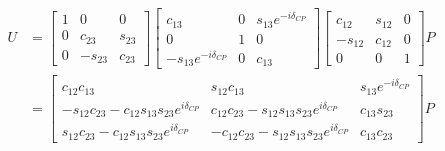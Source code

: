 \begin{equation}
    \begin{aligned}
        U & =
        \begin{bmatrix}
            1 & 0       & 0      \\
            0 & c_{23}  & s_{23} \\
            0 & -s_{23} & c_{23}
        \end{bmatrix}
        \begin{bmatrix}
            c_{13}                   & 0 & s_{13}e^{-i\delta_{CP}} \\
            0                        & 1 & 0                       \\
            -s_{13}e^{-i\delta_{CP}} & 0 & c_{13}
        \end{bmatrix}
        \begin{bmatrix}
            c_{12}  & s_{12} & 0 \\
            -s_{12} & c_{12} & 0 \\
            0       & 0      & 1
        \end{bmatrix}
        P     \\
          & =
        \begin{bmatrix}
            c_{12}c_{13}                                       & s_{12}c_{13}                                     & s_{13}e^{-i\delta_{CP}} \\
            -s_{12}c_{23} - c_{12}s_{13}s_{23}e^{i\delta_{CP}} & c_{12}c_{23}-s_{12}s_{13}s_{23}e^{i\delta_{CP}}  & c_{13}s_{23}            \\
            s_{12}c_{23} - c_{12}s_{13}s_{23}e^{i\delta_{CP}}  & -c_{12}c_{23}-s_{12}s_{13}s_{23}e^{i\delta_{CP}} & c_{13}c_{23}
        \end{bmatrix}
        P
    \end{aligned}
    \label{eq:pmns_matrix}
\end{equation}
